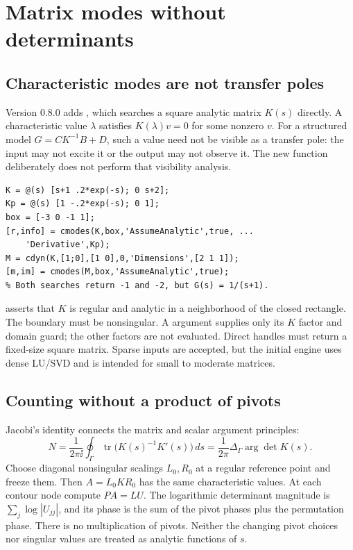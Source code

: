 \chapter{Matrix modes without determinants}\label{ch:matrixmodes}

\section{Characteristic modes are not transfer poles}

Version 0.8.0 adds , which searches a square analytic matrix $K(s)$ directly. A characteristic value
$\lambda$ satisfies $K(\lambda)v=0$ for some nonzero $v$. For a structured
model $G=C K^{-1}B+D$, such a value need not be visible as a transfer pole:
the input may not excite it or the output may not observe it. The new
function deliberately does not perform that visibility analysis.

\begin{lstlisting}
K = @(s) [s+1 .2*exp(-s); 0 s+2];
Kp = @(s) [1 -.2*exp(-s); 0 1];
box = [-3 0 -1 1];
[r,info] = cmodes(K,box,'AssumeAnalytic',true, ...
    'Derivative',Kp);
M = cdyn(K,[1;0],[1 0],0,'Dimensions',[2 1 1]);
[m,im] = cmodes(M,box,'AssumeAnalytic',true);
% Both searches return -1 and -2, but G(s) = 1/(s+1).
\end{lstlisting}

 asserts that $K$ is regular and analytic in a
neighborhood of the closed rectangle. The boundary must be nonsingular.
A  argument supplies only its $K$ factor and domain guard;
the other factors are not evaluated. Direct handles must return a
fixed-size square matrix. Sparse inputs are accepted, but the initial
engine uses dense LU/SVD and is intended for small to moderate matrices.

\section{Counting without a product of pivots}

Jacobi's identity connects the matrix and scalar argument principles:
\begin{equation}
 N=\frac{1}{2\pi\ii}\oint_\Gamma
       \operatorname{tr}\bigl(K(s)^{-1}K'(s)\bigr)\,ds
   =\frac{1}{2\pi}\Delta_\Gamma\arg\det K(s).
\end{equation}
Choose diagonal nonsingular scalings $L_0,R_0$ at a regular reference
point and freeze them. Then $A=L_0KR_0$ has the same characteristic values.
At each contour node compute $PA=LU$. The logarithmic determinant
magnitude is $\sum_j\log|U_{jj}|$, and its phase is the sum of the pivot
phases plus the permutation phase. There is no multiplication of pivots.
Neither the changing pivot choices nor singular values are treated as
analytic functions of $s$.

